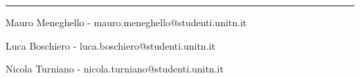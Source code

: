 \documentclass[a4paper,12pt]{article}
\begin{document}
\vspace{0.5cm}
\hrule
\vspace{0.5cm}


Mauro Meneghello - mauro.meneghello@studenti.unitn.it

Luca Boschiero -  luca.boschiero@studenti.unitn.it

Nicola Turniano - nicola.turniano@studenti.unitn.it

 
\end{document}

